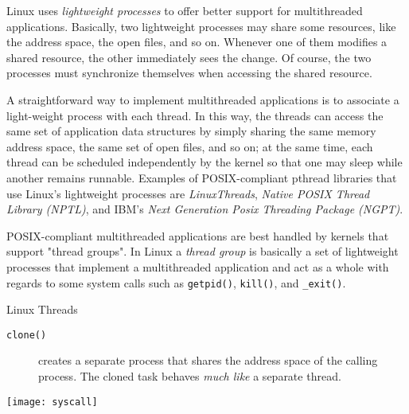 Linux uses \emph{lightweight processes} to offer better support for multithreaded
applications. Basically, two lightweight processes may share some resources, like the
address space, the open files, and so on. Whenever one of them modifies a shared resource,
the other immediately sees the change. Of course, the two processes must synchronize
themselves when accessing the shared resource.

A straightforward way to implement multithreaded applications is to associate a
light-weight process with each thread. In this way, the threads can access the same set of
application data structures by simply sharing the same memory address space, the same set
of open files, and so on; at the same time, each thread can be scheduled independently by
the kernel so that one may sleep while another remains runnable. Examples of
POSIX-compliant pthread libraries that use Linux's lightweight processes are
\emph{LinuxThreads}, \emph{Native POSIX Thread Library (NPTL)}, and IBM's \emph{Next
  Generation Posix Threading Package (NGPT)}.

POSIX-compliant multithreaded applications are best handled by kernels that support
"thread groups". In Linux a \emph{thread group} is basically a set of lightweight
processes that implement a multithreaded application and act as a whole with regards to
some system calls such as \texttt{getpid()}, \texttt{kill()}, and \texttt{\_exit()}.


\begin{frame}{Linux Threads}
  \begin{description}
  \item[\texttt{clone()}] creates a separate process that shares the address space of the
    calling process. The cloned task behaves \emph{much like} a separate thread.
  \end{description}

  \centering\texttt{[image: syscall]}
\end{frame}

